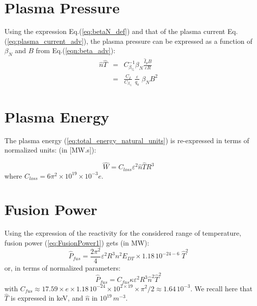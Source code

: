 \section{Plasma Pressure}
Using the expression Eq.(\ref{eq:betaN_def}) and that of the plasma current Eq.(\ref{eq:plasma_current_adv}), the plasma pressure can be expressed as a function of $\beta_N$ and $B$ from Eq.(\ref{eqn:beta_adv}):
\begin{eqnarray}
\hat n\hat T &=& C_{\beta_\%}^{-1} \beta_N \frac{\hat I_p B}{\varepsilon R} \nonumber \\
&=& \frac{C_I}{C_{\beta_\%}}\; \frac{\varepsilon}{q_a} \;  \beta_N B^2
\label{eqn:nT_betaN_adv}
\end{eqnarray}

\section{Plasma Energy}
The plasma energy (\ref{eq:total_energy_natural_units}) is re-expressed in terms of normalized units: (in [MW.s]):

\begin{equation}
\hat W = C_{loss}  \varepsilon^2  \hat n \hat T R^3
\label{eq:total_energy}
\end{equation}
where $C_{loss} = 6 \pi^2 \times 10^{19} \times 10^{-3} e$.



\section{Fusion Power}
Using the expression of the reactivity for the considered range of temperature, fusion power (\ref{eq:FusionPower1}) gets (in MW):
\begin{equation}
\hat P_{fus} 
=
\frac{2\pi^2}{4}
\varepsilon^2 R^3
n^2 E_{DT}
\times
1.18\, 10^{-24-6}\; \hat T^2 
\end{equation}
or, in terms of normalized parameters:
\begin{equation}
\boxed{
	\hat P_{fus} 
	=
	C_{fus} \kappa \varepsilon^2 R^3 \hat n^2 \hat T^2
}
\label{eq:DT_fusion_power_adv}
\end{equation}
with $C_{fus} \approx 17.59 \times e\times 1.18\, 10^{-24} \times 10^{2\times19}\times \pi^2/2 \approx 1.64\, 10^{-3}$. We recall here that $\hat T$ is expressed in keV, and $\hat n$ in $10^{19} \, \si{m^{-3}}$. 



